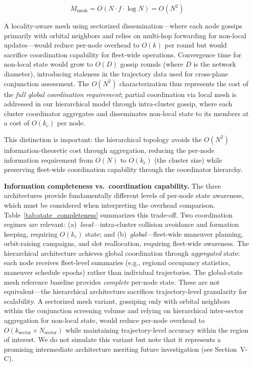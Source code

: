 \documentclass[journal]{IEEEtran}
\begin{document}
\begin{equation}
    M_{\text{mesh}} = O(N \cdot f \cdot \log N) = O(N^2)
    \label{eq:mesh_messages}
\end{equation}

A locality-aware mesh using sectorized dissemination---where each node gossips primarily with orbital neighbors and relies on multi-hop forwarding for non-local updates---would reduce per-node overhead to $O(k)$ per round but would sacrifice coordination capability for fleet-wide operations. Convergence time for non-local state would grow to $O(D)$ gossip rounds (where $D$ is the network diameter), introducing staleness in the trajectory data used for cross-plane conjunction assessment. The $O(N^2)$ characterization thus represents the cost of the \emph{full global coordination requirement}; partial coordination via local mesh is addressed in our hierarchical model through intra-cluster gossip, where each cluster coordinator aggregates and disseminates non-local state to its members at a cost of $O(k_c)$ per node.

This distinction is important: the hierarchical topology avoids the $O(N^2)$ information-theoretic cost through aggregation, reducing the per-node information requirement from $O(N)$ to $O(k_c)$ (the cluster size) while preserving fleet-wide coordination capability through the coordinator hierarchy.

\textbf{Information completeness vs.\ coordination capability.} The three architectures provide fundamentally different levels of per-node state awareness, which must be considered when interpreting the overhead comparison. Table~\ref{tab:state_completeness} summarizes this trade-off. Two coordination regimes are relevant: (a)~\emph{local}---intra-cluster collision avoidance and formation keeping, requiring $O(k_c)$ state; and (b)~\emph{global}---fleet-wide maneuver planning, orbit-raising campaigns, and slot reallocation, requiring fleet-wide awareness. The hierarchical architecture achieves global coordination through \emph{aggregated} state: each node receives fleet-level summaries (e.g., regional occupancy statistics, maneuver schedule epochs) rather than individual trajectories. The global-state mesh reference baseline provides \emph{complete} per-node state. These are not equivalent---the hierarchical architecture sacrifices trajectory-level granularity for scalability. A sectorized mesh variant, gossiping only with orbital neighbors within the conjunction screening volume and relying on hierarchical inter-sector aggregation for non-local state, would reduce per-node overhead to $O(k_{\text{sector}} \times N_{\text{sector}})$ while maintaining trajectory-level accuracy within the region of interest. We do not simulate this variant but note that it represents a promising intermediate architecture meriting future investigation (see Section~V-C).
\end{document}
